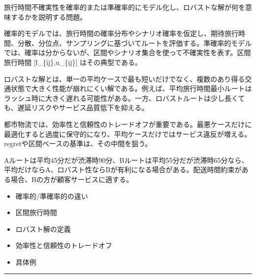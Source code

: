 \clearpage
{}
旅行時間不確実性を確率的または準確率的にモデル化し、ロバストな解が何を意味するかを説明する問題。\par
{}
確率的モデルでは、旅行時間の確率分布やシナリオ確率を仮定し、期待旅行時間、分散、分位点、サンプリングに基づいてルートを評価する。準確率的モデルでは、確率は分からないが、区間やシナリオ集合を使って不確実性を表す。区間旅行時間 [l\_\{ij\},u\_\{ij\}] はその典型である。\par
ロバストな解とは、単一の平均ケースで最も短いだけでなく、複数のあり得る交通状態で大きく性能が崩れにくい解である。例えば、平均旅行時間最小ルートはラッシュ時に大きく遅れる可能性がある。一方、ロバストルートは少し長くても、遅延リスクやサービス品質低下を抑える。\par
都市物流では、効率性と信頼性のトレードオフが重要である。最悪ケースだけに最適化すると過度に保守的になり、平均ケースだけではサービス違反が増える。regretや区間ベースの基準は、その中間を狙う。\par
{}
Aルートは平均45分だが渋滞時90分、Bルートは平均55分だが渋滞時65分なら、平均だけならA、ロバスト性ならBが有利になる場合がある。配送時間約束がある場合、Bの方が顧客サービスに適する。\par
{}
\begin{itemize}
\item 確率的/準確率的の違い
\item 区間旅行時間
\item ロバスト解の定義
\item 効率性と信頼性のトレードオフ
\item 具体例
\end{itemize}
\vspace{2mm}\hrule\vspace{2mm}

